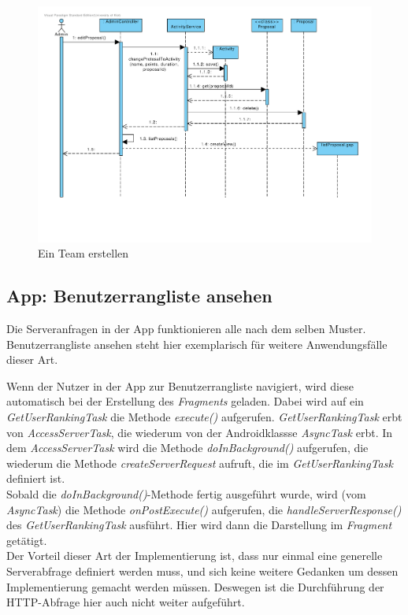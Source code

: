 \begin{figure}[H]
  \centering
  \includegraphics[width=\textwidth, clip]{gfx/vorschlag_in_aktivitaet_umwandeln}
  \caption{Ein Team erstellen}
\end{figure}


\subsection{App: Benutzerrangliste ansehen}
Die Serveranfragen in der App funktionieren alle nach dem selben
Muster. Benutzerrangliste ansehen steht hier exemplarisch für weitere
Anwendungsfälle dieser Art.


Wenn der Nutzer in der App zur Benutzerrangliste navigiert, wird diese automatisch bei der Erstellung des \emph{Fragments} geladen. Dabei wird auf ein \emph{GetUserRankingTask} die Methode \emph{execute()} aufgerufen. \emph{GetUserRankingTask} erbt von \emph{AccessServerTask}, die wiederum von der Androidklassse \emph{AsyncTask} erbt. In dem \emph{AccessServerTask} wird die Methode \emph{doInBackground()} aufgerufen, die wiederum die Methode \emph{createServerRequest} aufruft, die im \emph{GetUserRankingTask} definiert ist.\\
Sobald die \emph{doInBackground()}-Methode fertig ausgeführt wurde, wird (vom \emph{AsyncTask}) die Methode \emph{onPostExecute()} aufgerufen, die \emph{handleServerResponse()} des \emph{GetUserRankingTask} ausführt. Hier wird dann die Darstellung im \emph{Fragment} getätigt.\\
Der Vorteil dieser Art der Implementierung ist, dass nur einmal eine generelle Serverabfrage definiert werden muss, und sich keine weitere Gedanken um dessen Implementierung gemacht werden m\"ussen. Deswegen ist die Durchführung der HTTP-Abfrage hier auch nicht weiter aufgeführt.